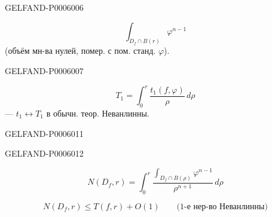 \begin{GelfandAdjacentEvidence}{GELFAND-P000600}{6}

\[
\int_{D_f\cap B(r)}\varphi^{n-1}
\]
(объём мн-ва нулей, помер. с пом. станд. \(\varphi\)).
\end{GelfandAdjacentEvidence}
\begin{GelfandAdjacentEvidence}{GELFAND-P000600}{7}

\[
T_1=\int_0^r\frac{t_1(f,\varphi)}{\rho}\,d\rho
\]
— \(t_1\leftrightarrow T_1\) в обычн. теор. Неванлинны.
\end{GelfandAdjacentEvidence}



\begin{GelfandAdjacentEvidence}{GELFAND-P000601}{1}
\end{GelfandAdjacentEvidence}
\begin{GelfandAdjacentEvidence}{GELFAND-P000601}{2}

\[
N(D_f,r)=\int_0^r
\frac{\displaystyle\int_{D_f\cap B(\rho)}\varphi^{n-1}}{\rho^{n+1}}\,d\rho
\]
\end{GelfandAdjacentEvidence}

\[
N(D_f,r)\le T(f,r)+O(1)\qquad\text{(1-е нер-во Неванлинны)}
\]


